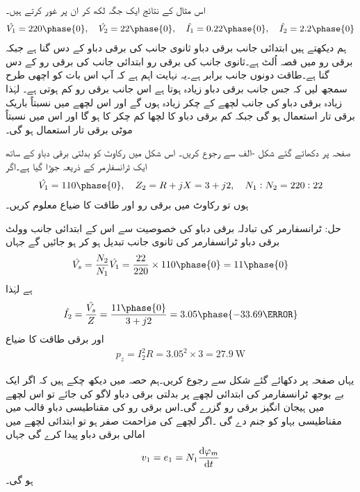 اس مثال کے نتائج ایک جگہ لکھ کر ان پر غور کرتے ہیں۔
\begin{align*}
\hat{V_1}=220\phase{0}, \quad \hat{V_2}=22\phase{0}, \quad \hat{I_1}=0.22\phase{0}, \quad \hat{I_2}=2.2\phase{0}
\end{align*}
ہم دیکھتے ہیں ابتدائی جانب برقی دباو ثانوی جانب کی برقی دباو کے دس گنا ہے جبکہ برقی رو میں قصہ اُلٹ ہے۔ثانوی جانب کی برقی رو ابتدائی جانب کی برقی رو کے دس گنا ہے۔طاقت دونوں جانب برابر ہے۔یہ نہایت اہم ہے کہ آپ اس بات کو اچھی طرح سمجھ لیں کہ جس جانب برقی دباو زیادہ ہوتا ہے اس جانب برقی رو کم ہوتی ہے۔ لہٰذا زیادہ برقی دباو کی جانب لچھے کے چکر زیادہ ہوں گے اور اس لچھے میں نسبتاً باریک برقی تار استعمال ہو گی جبکہ کم برقی دباو کا لچھا کم چکر کا ہو گا اور اس میں نسبتاً موٹی برقی تار استعمال ہو گی۔ 

	صفحہ  پر دکھائے گئے شکل -الف سے رجوع کریں۔ اس شکل میں رکاوٹ  کو  بدلتی برقی دباو  کے ساتھ ایک ٹرانسفارمر کے ذریعہ جوڑا گیا ہے۔اگر
\begin{align*}
\hat{V_1}=110\phase{0},\quad Z_2=R+j X=3+j 2,\quad N_1:N_2=220:22 
\end{align*}
ہوں تو رکاوٹ میں برقی رو اور طاقت کا ضیاع معلوم کریں۔

حل:
	ٹرانسفارمر کی تبادلہ برقی دباو کی خصوصیت سے اس کے ابتدائی جانب  وولٹ برقی دباو ٹرانسفارمر کی ثانوی جانب تبدیل ہو کر   ہو جائیں گے جہاں
\begin{align*}
\hat{V_s}=\frac{N_2}{N_1} \hat{V_1}=\frac{22}{220} \times 110\phase{0}=11\phase{0}
\end{align*}
ہے لہٰذا
\begin{align*}
\hat{I_2}=\frac{\hat{V_s}}{Z}=\frac{11\phase{0}}{3+j 2}= 3.05\phase{-33.69\degree}
\end{align*}
اور برقی طاقت کا ضیاع 
\begin{align*}
p_z=I_2^2 R=3.05^2 \times 3=\SI{27.9}{\watt}
\end{align*}

یہاں صفحہ  پر دکھائے گئے  شکل   سے رجوع کریں۔ہم حصہ   میں دیکھ چکے ہیں کہ اگر ایک بے بوجھ ٹرانسفارمر کی ابتدائی لچھے پر بدلتی برقی دباو  لاگو کی جائے تو اس لچھے میں ہیجان انگیز برقی رو  گزرے گی۔اس برقی رو کی مقناطیسی دباو  قالب میں مقناطیسی بہاو  کو جنم دے گی ۔اگر لچھے کی مزاحمت صفر ہو تو  ابتدائی لچھے میں  امالی برقی دباو پیدا کرے گی جہاں
\begin{align}\label{مساوات_ٹرانسفارمر_دباو_برابر_بہاو_تفرق}
v_1=e_1=N_1 \frac{\dif \varphi_m}{\dif t}
\end{align}
ہو گی۔

